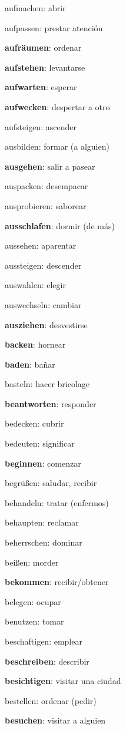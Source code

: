 \begin{multicols}{2}
\begin{myitemize}
\item aufmachen: abrir
\item aufpassen: prestar atención
\item \textbf{aufräumen}: ordenar
\item \textbf{aufstehen}: levantarse
\item \textbf{aufwarten}: esperar
\item \textbf{aufwecken}: despertar a otro
\item aufsteigen: ascender
\item ausbilden: formar (a alguien)
\item \textbf{ausgehen}: salir a pasear
\item auspacken: desempacar
\item ausprobieren: saborear
\item \textbf{ausschlafen}: dormir (de más)
\item aussehen: aparentar
\item aussteigen: descender
\item auswahlen: elegir
\item auswechseln: cambiar
\item \textbf{ausziehen}: desvestirse
\item \textbf{backen}: hornear
\item \textbf{baden}: bañar
\item basteln: hacer bricolage
\item \textbf{beantworten}: responder
\item bedecken: cubrir
\item bedeuten: significar
\item \textbf{beginnen}: comenzar
\item begrüßen: saludar, recibir
\item behandeln: tratar (enfermos)
\item behaupten: reclamar
\item beherrschen: dominar
\item beißen: morder
\item \textbf{bekommen}: recibir/obtener
\item belegen: ocupar
\item benutzen: tomar
\item beschaftigen: emplear
\item \textbf{beschreiben}: describir
\item \textbf{besichtigen}: visitar una ciudad
\item bestellen: ordenar (pedir)
\item \textbf{besuchen}: visitar a alguien

\end{myitemize}
\end{multicols}
